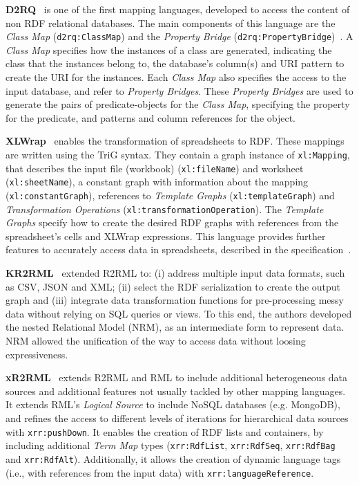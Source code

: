 \noindent\textbf{D2RQ}~\parencite{bizer2004d2rq} is one of the first mapping languages, developed to access the content of non RDF relational databases. The main components of this language are the \textit{Class Map} (\texttt{d2rq:ClassMap}) and the \textit{Property Bridge} (\texttt{d2rq:PropertyBridge})~\parencite{d2rq}. A \textit{Class Map} specifies how the instances of a class are generated, indicating the class that the instances belong to, the database's column(s) and URI pattern to create the URI for the instances. Each \textit{Class Map} also specifies the access to the input database, and refer to \textit{Property Bridges}. These \textit{Property Bridges} are used to generate the pairs of predicate-objects for the \textit{Class Map}, specifying the property for the predicate, and patterns and column references for the object. 


\noindent\textbf{XLWrap}~\parencite{langegger2009xlwrap} enables the transformation of spreadsheets to RDF. These mappings are written using the TriG syntax. They contain a graph instance of \texttt{xl:Mapping}, that describes the input file (workbook) (\texttt{xl:fileName}) and worksheet (\texttt{xl:sheetName}), a constant graph with information about the mapping (\texttt{xl:constantGraph}), references to \textit{Template Graphs} (\texttt{xl:templateGraph}) and \textit{Transformation Operations} (\texttt{xl:transformationOperation}). The \textit{Template Graphs} specify how to create the desired RDF graphs with references from the spreadsheet's cells and XLWrap expressions. This language provides further features to accurately access data in spreadsheets, described in the specification~\parencite{xlwrap}.  

\noindent\textbf{KR2RML}~\parencite{slepicka2015kr2rml} extended R2RML to: (i) address multiple input data formats, such as CSV, JSON and XML; (ii) select the RDF serialization to create the output graph and (iii) integrate data transformation functions for pre-processing messy data without relying on SQL queries or views. To this end, the authors developed the nested Relational Model (NRM), as an intermediate form to represent data. NRM allowed the unification of the way to access data without loosing expressiveness. 

\noindent\textbf{xR2RML}~\parencite{michel2015xr2rml} extends R2RML and RML to include additional heterogeneous data sources and additional features not usually tackled by other mapping languages. It extends RML's \textit{Logical Source} to include NoSQL databases (e.g. MongoDB), and refines the access to different levels of iterations for hierarchical data sources with \texttt{xrr:pushDown}. It enables the creation of RDF lists and containers, by including additional \textit{Term Map} types (\texttt{xrr:RdfList}, \texttt{xrr:RdfSeq}, \texttt{xrr:RdfBag} and \texttt{xrr:RdfAlt}). Additionally, it allows the creation of dynamic language tags (i.e., with references from the input data) with \texttt{xrr:languageReference}.


